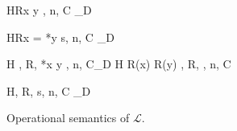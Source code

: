 \begin{figure}
\begin{minipage}{\textwidth}
\begin{minipage}{0.5\textwidth}
{\langle H\coma R\coma  *x \leftarrow y , n, C\rangle
  \longrightarrow_{D} \MEMEX }
\end{minipage}
\begin{minipage}{0.5\textwidth}
{\langle H\coma R\coma  \LET x = *y \; \IN s, n, C\rangle
    \longrightarrow_{D} \MEMEX}
\end{minipage}


{ \langle H , R, *x \leftarrow y , n, C\rangle \xlongrightarrow{}_{D}
  \langle H \Lfc R(x) \mapsto R(y) \Rfc , R, \SKIP , n, C \rangle }

{\langle H, R, \scon\Sirx s, n, C \rangle \xlongrightarrow{\rho}_{D} \CONSTEX }


\end{minipage}

\caption{Operational semantics of \(\mathcal{L}\).}
\label{fig:transitionRules}
\end{figure}
